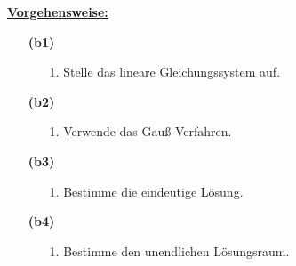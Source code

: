 \begin{mdframed}
\underline{\textbf{Vorgehensweise:}}
\renewcommand{\labelenumi}{\theenumi.}
\begin{enumerate}
\item[\textbf{(b1)}]
\begin{enumerate}
	\item[1.] Stelle das lineare Gleichungssystem auf.
\end{enumerate}
\item[\textbf{(b2)}]
\begin{enumerate}
	\item[1.] Verwende das Gauß-Verfahren.
\end{enumerate}
\item[\textbf{(b3)}]
\begin{enumerate}
	\item[1.] Bestimme die eindeutige Lösung.
\end{enumerate}
\item[\textbf{(b4)}]
\begin{enumerate}
	\item[1.] Bestimme den unendlichen Lösungsraum.
\end{enumerate}
\end{enumerate}
\end{mdframed}

